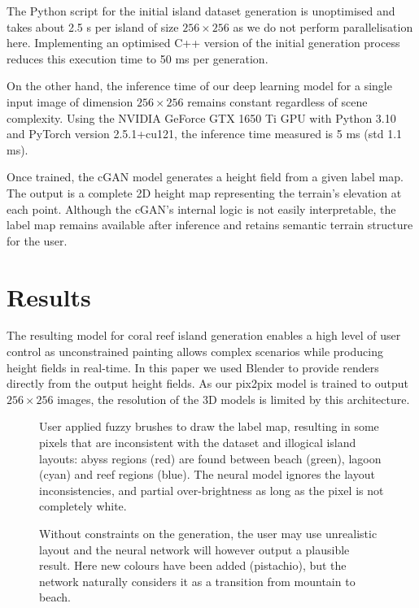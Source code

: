 The Python script for the initial island dataset generation is unoptimised and takes about 2.5 s per island of size $256 \times 256$ as we do not perform parallelisation here. Implementing an optimised C++ version of the initial generation process reduces this execution time to 50 ms per generation.

On the other hand, the inference time of our deep learning model for a single input image of dimension $256 \times 256$ remains constant regardless of scene complexity. Using the NVIDIA GeForce GTX 1650 Ti GPU with Python 3.10 and PyTorch version 2.5.1+cu121, the inference time measured is 5 ms (std 1.1 ms).

Once trained, the cGAN model generates a height field from a given label map. The output is a complete 2D height map representing the terrain's elevation at each point. Although the cGAN's internal logic is not easily interpretable, the label map remains available after inference and retains semantic terrain structure for the user.

\section{Results}
\label{sec:coral-island-results}

The resulting model for coral reef island generation enables a high level of user control as unconstrained painting allows complex scenarios while producing height fields in real-time. In this paper we used Blender to provide renders directly from the output height fields. As our pix2pix model is trained to output $256\times256$ images, the resolution of the 3D models is limited by this architecture.

\begin{figure}
    \caption[Output of the cGAN on fuzzy inputs]{User applied fuzzy brushes to draw the label map, resulting in some pixels that are inconsistent with the dataset and illogical island layouts: abyss regions (red) are found between beach (green), lagoon (cyan) and reef regions (blue). The neural model ignores the layout inconsistencies, and partial over-brightness as long as the pixel is not completely white.}
    \label{fig:coral-island-results-fuzzy}
\end{figure}
\begin{figure}
    \caption[Output of the cGAN with new colors in the input]{Without constraints on the generation, the user may use unrealistic layout and the neural network will however output a plausible result. Here new colours have been added (pistachio), but the network naturally considers it as a transition from mountain to beach.}
    \label{fig:coral-island-results-dino}
\end{figure}


